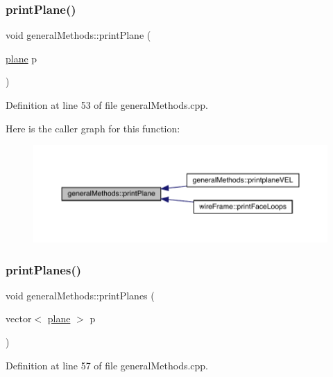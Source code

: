 \subsubsection{\texorpdfstring{print\+Plane()}{printPlane()}}
{\footnotesize\ttfamily void general\+Methods\+::print\+Plane (\begin{DoxyParamCaption}\item[{\mbox{\hyperlink{structplane}{plane}}}]{p }\end{DoxyParamCaption})}



Definition at line 53 of file general\+Methods.\+cpp.

Here is the caller graph for this function\+:
\nopagebreak
\begin{figure}[H]
\begin{center}
\leavevmode
\includegraphics[width=350pt]{namespacegeneral_methods_a3474d24f9f545407bb5f73250a5e19d7_icgraph}
\end{center}
\end{figure}
\mbox{\label{namespacegeneral_methods_aa7c9b8abc94ae6b08d2cf083a08eaf21}} 
\subsubsection{\texorpdfstring{print\+Planes()}{printPlanes()}}
{\footnotesize\ttfamily void general\+Methods\+::print\+Planes (\begin{DoxyParamCaption}\item[{vector$<$ \mbox{\hyperlink{structplane}{plane}} $>$}]{p }\end{DoxyParamCaption})}



Definition at line 57 of file general\+Methods.\+cpp.

\mbox{\label{namespacegeneral_methods_adc8e104a2f2ed35a22be9a68051ec38d}} 
